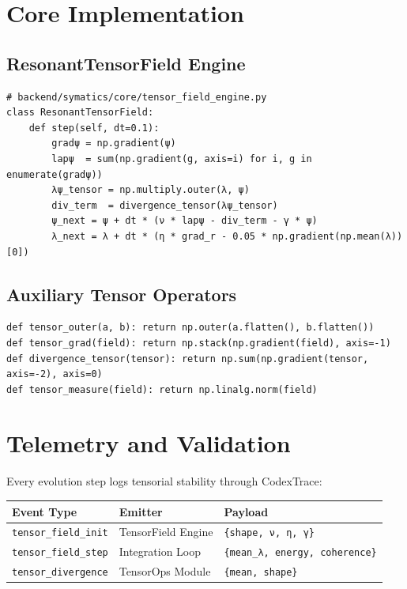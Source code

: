 \documentclass[11pt]{article}
\begin{document}
\section{Core Implementation}
\subsection*{ResonantTensorField Engine}
\begin{verbatim}
# backend/symatics/core/tensor_field_engine.py
class ResonantTensorField:
    def step(self, dt=0.1):
        gradψ = np.gradient(ψ)
        lapψ  = sum(np.gradient(g, axis=i) for i, g in enumerate(gradψ))
        λψ_tensor = np.multiply.outer(λ, ψ)
        div_term  = divergence_tensor(λψ_tensor)
        ψ_next = ψ + dt * (ν * lapψ - div_term - γ * ψ)
        λ_next = λ + dt * (η * grad_r - 0.05 * np.gradient(np.mean(λ))[0])
\end{verbatim}

\subsection*{Auxiliary Tensor Operators}
\begin{verbatim}
def tensor_outer(a, b): return np.outer(a.flatten(), b.flatten())
def tensor_grad(field): return np.stack(np.gradient(field), axis=-1)
def divergence_tensor(tensor): return np.sum(np.gradient(tensor, axis=-2), axis=0)
def tensor_measure(field): return np.linalg.norm(field)
\end{verbatim}

\section{Telemetry and Validation}
Every evolution step logs tensorial stability through CodexTrace:

\begin{center}
\renewcommand{\arraystretch}{1.3}
\begin{tabular}{lll}
\toprule
\textbf{Event Type} & \textbf{Emitter} & \textbf{Payload}\\
\midrule
\texttt{tensor\_field\_init} & TensorField Engine & \texttt{\{shape, ν, η, γ\}}\\
\texttt{tensor\_field\_step} & Integration Loop & \texttt{\{mean\_λ, energy, coherence\}}\\
\texttt{tensor\_divergence} & TensorOps Module & \texttt{\{mean, shape\}}\\
\bottomrule
\end{tabular}
\end{center}
\end{document}
